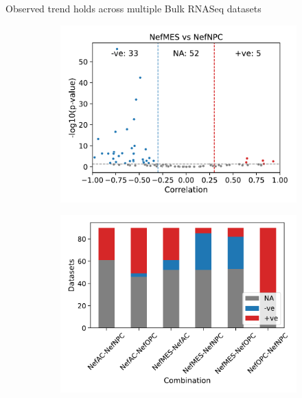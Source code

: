 \documentclass[aspectratio=169,9pt]{beamer}
\begin{document}
    \begin{frame}{Observed trend holds across multiple Bulk RNASeq datasets}
        \begin{adjustwidth}{-5cm}{-5cm}
            \centering
            \begin{figure}
                \centering
                \begin{subfigure}[c]{0.22\textwidth}
                    \centering
                    \includegraphics[width=\textwidth]{Volcano_Bulk_NefMES-NefNPC}
                \end{subfigure}
                \begin{subfigure}[c]{0.33\textwidth}
                    \centering
                    \includegraphics[width=\textwidth]{Bar_Bulk_Nef}

\end{subfigure}
\end{figure}
\end{adjustwidth}
\end{frame}
\end{document}
